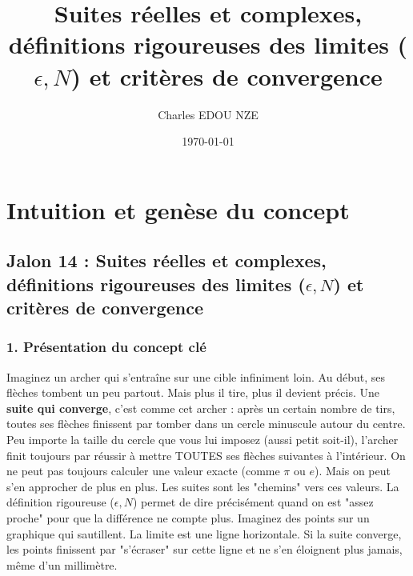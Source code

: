 \documentclass[a4paper,11pt]{report}
\title{Suites réelles et complexes, définitions rigoureuses des limites ($\epsilon, N$) et critères de convergence}
\author{Charles EDOU NZE}
\date{\today}
\begin{document}
\maketitle
\tableofcontents
\newpage

\chapter{Intuition et genèse du concept}

\section*{Jalon 14 : Suites réelles et complexes, définitions rigoureuses des limites ($\epsilon, N$) et critères de convergence}

\subsection*{1. Présentation du concept clé}

 Imaginez un archer qui s'entraîne sur une cible infiniment loin. Au début, ses flèches tombent un peu partout. Mais plus il tire, plus il devient précis. Une \textbf{suite qui converge}, c'est comme cet archer : après un certain nombre de tirs, toutes ses flèches finissent par tomber dans un cercle minuscule autour du centre. Peu importe la taille du cercle que vous lui imposez (aussi petit soit-il), l'archer finit toujours par réussir à mettre TOUTES ses flèches suivantes à l'intérieur.
 On ne peut pas toujours calculer une valeur exacte (comme $\pi$ ou $e$). Mais on peut s'en approcher de plus en plus. Les suites sont les "chemins" vers ces valeurs. La définition rigoureuse ($\epsilon, N$) permet de dire précisément quand on est "assez proche" pour que la différence ne compte plus.
 Imaginez des points sur un graphique qui sautillent. La limite est une ligne horizontale. Si la suite converge, les points finissent par "s'écraser" sur cette ligne et ne s'en éloignent plus jamais, même d'un millimètre.
\end{document}
